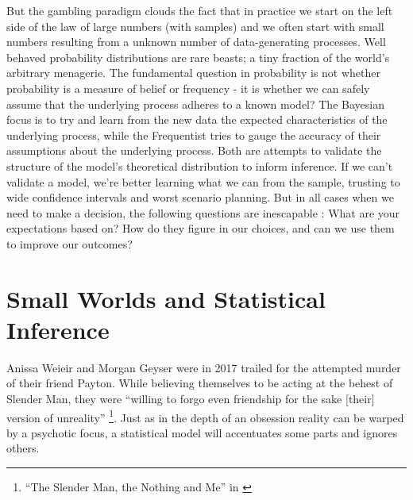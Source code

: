 \documentclass[]{tufte-book}
\theoremstyle{definition}
\theoremstyle{definition}
\theoremstyle{definition}
\theoremstyle{remark}
\begin{document}
But the gambling paradigm clouds the fact that in practice we start on the left side of the law of large numbers (with samples) and we often start with small numbers resulting from a unknown number of data-generating processes. Well behaved probability distributions are rare beasts; a tiny fraction of the world's arbitrary menagerie. The fundamental question in probability is not whether probability is a measure of belief or frequency - it is whether we can safely assume that the underlying process adheres to a known model? The Bayesian focus is to try and learn from the new data the expected characteristics of the underlying process, while the Frequentist tries to gauge the accuracy of their assumptions about the underlying process. Both are attempts to validate the structure of the model's theoretical distribution to inform inference. If we can't validate a model, we're better learning what we can from the sample, trusting to wide confidence intervals and worst scenario planning. But in all cases when we need to make a decision, the following questions are inescapable : What are your expectations based on? How do they figure in our choices, and can we use them to improve our outcomes?

\hypertarget{small-worlds-and-statistical-inference}{%
\section{Small Worlds and Statistical Inference}\label{small-worlds-and-statistical-inference}}

Anissa Weieir and Morgan Geyser were in 2017 trailed for the attempted murder of their friend Payton. While believing themselves to be acting at the behest of Slender Man, they were ``willing to forgo even friendship for the sake {[}their{]} version of unreality'' \footnote{``The Slender Man, the Nothing and Me'' in \citep{WangSchizophrenia}}. Just as in the depth of an obsession reality can be warped by a psychotic focus, a statistical model will accentuates some parts and ignores others.
\end{document}
